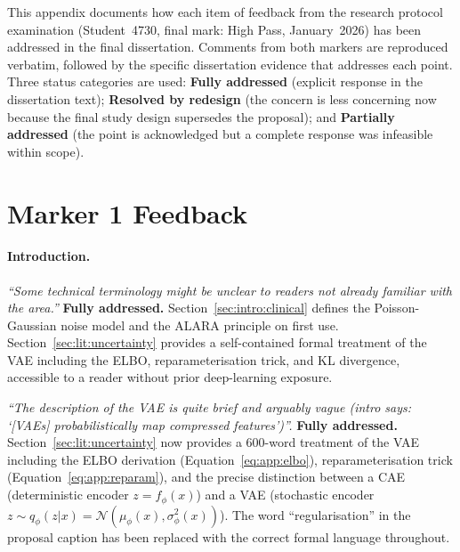 \documentclass[12pt, a4paper, twoside, openright]{book}
\begin{document}
\begin{appendices}
This appendix documents how each item of feedback from the research protocol examination (Student~4730, final mark: High Pass, January~2026) has been addressed in the final dissertation. Comments from both markers are reproduced verbatim, followed by the specific dissertation evidence that addresses each point. Three status categories are used: \textbf{Fully addressed} (explicit response in the dissertation text); \textbf{Resolved by redesign} (the concern is less concerning now because the final study design supersedes the proposal); and \textbf{Partially addressed} (the point is acknowledged but a complete response was infeasible within scope).

\section*{Marker 1 Feedback}

\paragraph{Introduction.}
\textit{``Some technical terminology might be unclear to readers not already familiar with the area.''}
\textbf{Fully addressed.} Section~\ref{sec:intro:clinical} defines the Poisson-Gaussian noise model and the ALARA principle on first use. Section~\ref{sec:lit:uncertainty} provides a self-contained formal treatment of the VAE including the ELBO, reparameterisation trick, and KL divergence, accessible to a reader without prior deep-learning exposure.

\textit{``The description of the VAE is quite brief and arguably vague (intro says: `[VAEs] probabilistically map compressed features')''.}
\textbf{Fully addressed.} Section~\ref{sec:lit:uncertainty} now provides a 600-word treatment of the VAE including the ELBO derivation (Equation~\ref{eq:app:elbo}), reparameterisation trick (Equation~\ref{eq:app:reparam}), and the precise distinction between a CAE (deterministic encoder $z = f_\phi(x)$) and a VAE (stochastic encoder $z \sim q_\phi(z|x) = \mathcal{N}(\mu_\phi(x), \sigma^2_\phi(x))$). The word ``regularisation'' in the proposal caption has been replaced with the correct formal language throughout.


\end{appendices}
\end{document}
